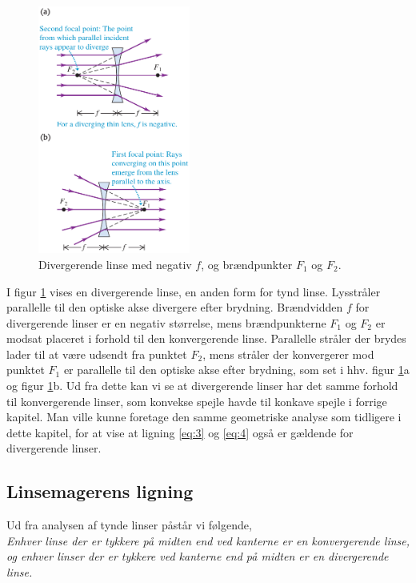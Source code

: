 \newpage

\begin{figure}
	\centering
	\includegraphics[width=5cm]{Geometrisk-Optik/div_lens.PNG}
	\caption{Divergerende linse med negativ $f$, og brændpunkter $F_1$ og $F_2$.}
	\label{div}
\end{figure}

\noindent I figur \ref{div} vises en divergerende linse, en anden form for tynd linse. Lysstråler parallelle til den optiske akse divergere efter brydning. Brændvidden $f$ for divergerende linser er en negativ størrelse, mens brændpunkterne $F_1$ og $F_2$ er modsat placeret i forhold til den konvergerende linse. Parallelle stråler der brydes lader til at være udsendt fra punktet $F_2$, mens stråler der konvergerer mod punktet $F_1$ er parallelle til den optiske akse efter brydning, som set i hhv. figur \ref{div}a og figur \ref{div}b. Ud fra dette kan vi se at divergerende linser har det samme forhold til konvergerende linser, som konvekse spejle havde til konkave spejle i forrige kapitel. Man ville kunne foretage den samme geometriske analyse som tidligere i dette kapitel, for at vise at ligning \eqref{eq:3} og \eqref{eq:4} også er gældende for divergerende linser.\\

\subsection{Linsemagerens ligning}
\noindent Ud fra analysen af tynde linser påstår vi følgende, \\

\noindent \textsl{Enhver linse der er tykkere på midten end ved kanterne er en konvergerende linse, og enhver linser der er tykkere ved kanterne end på midten er en divergerende linse.} \\


